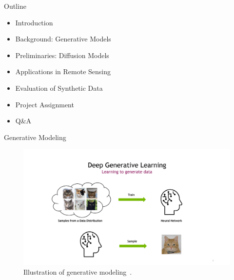 
\begin{refsection}
\begin{frame}{Outline}
  \begin{itemize}
    \item Introduction
    \item Background: Generative Models
    \item Preliminaries: Diffusion Models
    \item Applications in Remote Sensing
    \item Evaluation of Synthetic Data
    \item Project Assignment
    \item Q\&A
  \end{itemize}
\end{frame}
\end{refsection}

\begin{refsection}
\begin{frame}{Generative Modeling}
  \begin{figure}
    \centering
    \includegraphics[width=0.8\linewidth]{figs/learning_to_generate_data.png}
    \caption{\scriptsize Illustration of generative modeling~\parencite{CVPR2023Tutorial}.}
  \end{figure}
  \bottomleftrefs
\end{frame}
\end{refsection}


